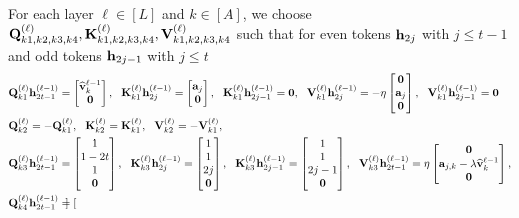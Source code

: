 For each layer $\ell\in[L]$ and $k\in[A]$, we choose
${\mathbf Q}_{k1,k2,k3,k4}^{(\ell)},{\mathbf K}_{k1,k2,k3,k4}^{(\ell)},{\mathbf V}_{k1,k2,k3,k4}^{(\ell)}$ such that for even tokens ${\mathbf h}_{2j}$ with $j\leq t-1$ and odd tokens ${\mathbf h}_{2j-1}$ with $j\leq t$
\begin{align*}
    &{\mathbf Q}_{k1}^{(\ell)}{\mathbf h}^{(\ell-1)}_{2t-1}=\begin{bmatrix}
        \widehat{{\mathbf v}}_k^{\ell-1}\\{\mathbf 0}
    \end{bmatrix},~~ {\mathbf K}_{k1}^{(\ell)}{\mathbf h}^{(\ell-1)}_{2j}=\begin{bmatrix}
        {\mathbf a}_{j}\\{\mathbf 0}
\end{bmatrix},~~{\mathbf K}_{k1}^{(\ell)}{\mathbf h}^{(\ell-1)}_{2j-1}={\mathbf 0},~~ {\mathbf V}_{k1}^{(\ell)}{\mathbf h}^{(\ell-1)}_{2j}=-\eta\begin{bmatrix}
        {\mathbf 0}\\ {\mathbf a}_j \\ {\mathbf 0}
    \end{bmatrix},~~{\mathbf V}_{k1}^{(\ell)}{\mathbf h}^{(\ell-1)}_{2j-1}={\mathbf 0}\\
    &
    {\mathbf Q}_{k2}^{(\ell)}=-{\mathbf Q}_{k1}^{(\ell)},~~ {\mathbf K}_{k2}^{(\ell)}={\mathbf K}_{k1}^{(\ell)},~~  {\mathbf V}_{k2}^{(\ell)}=-{\mathbf V}_{k1}^{(\ell)},\\
     &
     {\mathbf Q}_{k3}^{(\ell)}{\mathbf h}^{(\ell-1)}_{2t-1}=\begin{bmatrix}
         1\\1-2t\\ 1\\{\mathbf 0}
    \end{bmatrix},~~ {\mathbf K}_{k3}^{(\ell)}{\mathbf h}^{(\ell-1)}_{2j}=\begin{bmatrix}
        1\\ 1 \\2j\\{\mathbf 0}
    \end{bmatrix},~~
    {\mathbf K}_{k3}^{(\ell)}{\mathbf h}^{(\ell-1)}_{2j-1}=\begin{bmatrix}
        1\\ 1 \\2j-1\\{\mathbf 0}
    \end{bmatrix},~~ {\mathbf V}_{k3}^{(\ell)}{\mathbf h}^{(\ell-1)}_{2t-1}=\eta\begin{bmatrix}
        {\mathbf 0}\\ {\mathbf a}_{j,k}-\lambda\widehat{{\mathbf v}}_k^{\ell-1}\\ {\mathbf 0}
    \end{bmatrix},\\
     &
     {\mathbf Q}_{k4}^{(\ell)}{\mathbf h}^{(\ell-1)}_{2t-1}=\begin{bmatrix}

\end{bmatrix}
\end{align*}
